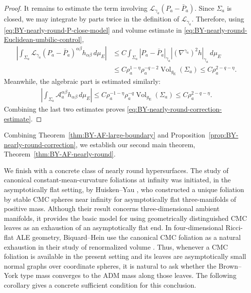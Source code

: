 \documentclass[10pt]{amsart}
\newcommand{\gE}{g_{\mathrm{E}}}
\newcommand{\Vol}{\operatorname{Vol}}
\theoremstyle{plain}
\theoremstyle{remark}
\begin{document}
\begin{proof}
		It remains to estimate the term involving
		$\mathcal L_{\gamma_a}(P_a-\bar P_a)$. Since $\Sigma_a$ is closed, we may
		integrate by parts twice in the definition of $\mathcal L_{\gamma_a}$. Therefore,
		using \eqref{eq:BY-nearly-round-P-close-model} and volume estimate in \eqref{eq:BY-nearly-round-Euclidean-umbilic-control},
		\begin{align*}
			\left|
			\int_{\Sigma_a}
			\mathcal L_{\gamma_a}(P_a-\bar P_a)^{\alpha\beta}
			h_{\alpha\beta}\,d\mu_E
			\right|
			&
			\leq
			C\int_{\Sigma_a}
			|P_a-\bar P_a|_{\gamma_a}
			|(\nabla^{\gamma_a})^2h|_{\gamma_a}\,d\mu_E\\
			&
			\leq
			C\rho_a^{1-\eta}\rho_a^{-q-2}\Vol_{\gE}(\Sigma_a)
			\leq
			C\rho_a^{2-q-\eta}.
		\end{align*}
		Meanwhile, the algebraic part is estimated similarly:
		\begin{align*}
			\left|
			\int_{\Sigma_a}
			\mathcal A_a^{\alpha\beta}
			h_{\alpha\beta}\,d\mu_E
			\right|
			\leq
			C\rho_a^{-1-\eta}\rho_a^{-q}\Vol_{\gE}(\Sigma_a)
			\leq
			C\rho_a^{2-q-\eta}.
		\end{align*}
		Combining the last two estimates proves
		\eqref{eq:BY-nearly-round-correction-estimate}.
	\end{proof}
	
	Combining Theorem~\ref{thm:BY-AF-large-boundary} and Proposition~\ref{prop:BY-nearly-round-correction}, we establish our second main theorem, Theorem~\ref{thm:BY-AF-nearly-round}.
	
	\medskip
	
	We finish with a concrete class of nearly round hypersurfaces. The study of canonical constant-mean-curvature foliations at infinity was
	initiated, in the asymptotically flat setting, by Huisken--Yau
	\cite{HuiskenYau}, who constructed a unique foliation by stable CMC spheres near infinity for asymptotically flat three-manifolds of positive mass.
	Although their result concerns three-dimensional ambient manifolds, it
	provides the basic model for using geometrically distinguished CMC leaves as
	an exhaustion of an asymptotically flat end.  In four-dimensional Ricci-flat
	ALE geometry, Biquard--Hein use the canonical CMC foliation as a natural
	exhaustion in their study of renormalized volume \cite{BH}.  Thus, whenever a
	CMC foliation is available in the present setting and its leaves are
	asymptotically small normal graphs over coordinate spheres, it is natural to
	ask whether the Brown--York type mass converges to the ADM mass along those
	leaves.  The following corollary gives a concrete sufficient condition for
	this conclusion.
	
\end{document}
